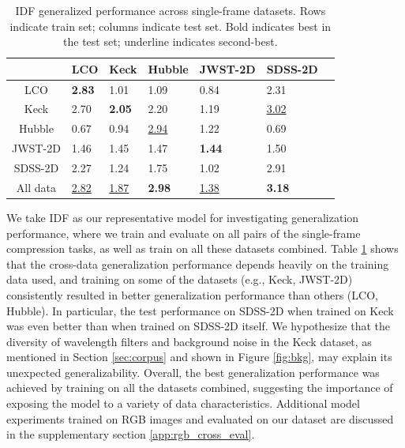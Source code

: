 \begin{table}
  \centering
  \vspace{-2.05em}
  \tiny
  \begin{tabular}{@{}c|llllll@{}}
    \toprule
    & LCO & Keck & Hubble & JWST-2D & SDSS-2D\\
    \midrule
    LCO & \textbf{2.83} & 1.01 & 1.09 & 0.84 & 2.31   \\
    \midrule
    Keck & 2.70 & \textbf{2.05} & 2.20 & 1.19 & \underline{3.02} \\
    \midrule
    Hubble & 0.67 & 0.94 & \underline{2.94} & 1.22 & 0.69 \\
    \midrule
    JWST-2D & 1.46 & 1.45 & 1.47 & \textbf{1.44} & 1.50 \\
    \midrule
    SDSS-2D & 2.27 & 1.24 & 1.75 & 1.02 & 2.91 \\
    \midrule
    All data & \underline{2.82} & \underline{1.87} & \textbf{2.98} & \underline{1.38} & \textbf{3.18} \\
    \bottomrule
  \end{tabular}
  \caption{IDF generalized performance across single-frame datasets. Rows indicate train set; columns indicate test set. Bold indicates best in the test set; underline indicates second-best.}
  \label{tab:generalization_performance}
\end{table}

We take IDF as our representative model for investigating generalization performance, where we train and evaluate on all pairs of the single-frame compression tasks, as well as train on all these datasets combined.
Table \ref{tab:generalization_performance} shows that the cross-data generalization performance depends heavily on the training data used, and training on 
some of the datasets (e.g., Keck, JWST-2D) consistently resulted in better generalization performance than others (LCO, Hubble).
In particular, the test performance on SDSS-2D when trained on Keck was even better than when trained on SDSS-2D itself. We hypothesize that the diversity of wavelength filters and background noise in the Keck dataset, as mentioned in Section \ref{sec:corpus} and shown in Figure \ref{fig:bkg}, may explain its unexpected generalizability. Overall, the best generalization performance was achieved by training on all the datasets combined, suggesting the importance of exposing the model to a variety of data characteristics. Additional model experiments trained on RGB images and evaluated on our dataset are discussed in the supplementary section \ref{app:rgb_cross_eval}. 
 

